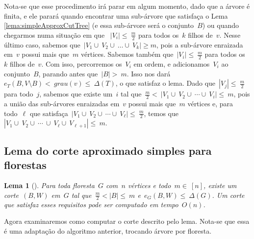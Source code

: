 \documentclass[a4paper,12pt]{article}
\newtheorem{lem}{Lema}
\begin{document}
	Nota-se que esse procedimento irá parar em algum momento, dado que a árvore 
	é finita, e ele parará quando encontrar
	uma sub-árvore que satisfaça o Lema 
	\ref{lema:simpleApproxCutTree}
	(e essa sub-árvore será o conjunto~$B$) 
	ou quando chegarmos numa situação em que  
	~$|V_i|\le~\frac{m}{2}$ para todos os~$k$ filhos de~$v$.
	Nesse último caso, sabemos que~$|V_1\cup~V_2\cup~\ldots \cup~V_k|\ge m$, pois
	a sub-árvore enraizada em~$v$ possui mais que~$m$ vértices. 
	Sabemos também que~$|V_i|\le~\frac{m}{2}$ para todos os~$k$ filhos de~$v$. 
	Com isso, percorremos os~$V_i$ em ordem, e 
	adicionamos~$V_i$ ao conjunto~$B$, parando antes que~$|B| >~m$. Isso nos 
	dará~$e_T(B,V\setminus B) <~grau(v)\le~\Delta(T)$, o que satisfaz o lema.
	Dado que~$|V_j|\le~\frac{m}{2}$ para todo~$j$,
	sabemos que existe um~$i$ tal 
	que~$\frac{m}{2} <~|V_1 \cup~V_2 \cup~\cdots \cup~V_i| \le~m$, pois
	a união das sub-árvores
	enraizadas em~$v$ possui mais que~$m$ vértices e, para todo~$\ell$ que 
	satisfaça~$|V_1\cup~V_2\cup~\cdots\cup~V_\ell|\le~\frac{m}{2}$, temos 
	que~$|V_1\cup~V_2\cup~\cdots~\cup~V_\ell\cup~V_{\ell+1}|\le~m$.


\bigskip
\bigskip
\bigskip


\subsection{Lema do corte aproximado simples para florestas}

\begin{lem}[{\cite[Lemma 2]{Schmidt15}}]
\label{lema:simpleApproxCutForest}
	Para toda floresta~$G$ com~$n$ vértices e todo~$m \in~[n]$,
	existe um corte~$(B,W)$ em~$G$ tal 
	que~$\frac{m}{2} <|B| \le~m$ e~$e_G(B,W) \le~\Delta(G)$.
	Um corte que satisfaz esses requisitos pode ser computado em
	tempo~$O(n)$.
\end{lem}

\bigskip

Agora examinaremos como computar o corte descrito pelo lema.
Nota-se que essa é uma adaptação do algoritmo anterior, 
trocando árvore por floresta.

\medskip
\medskip
\end{document}
